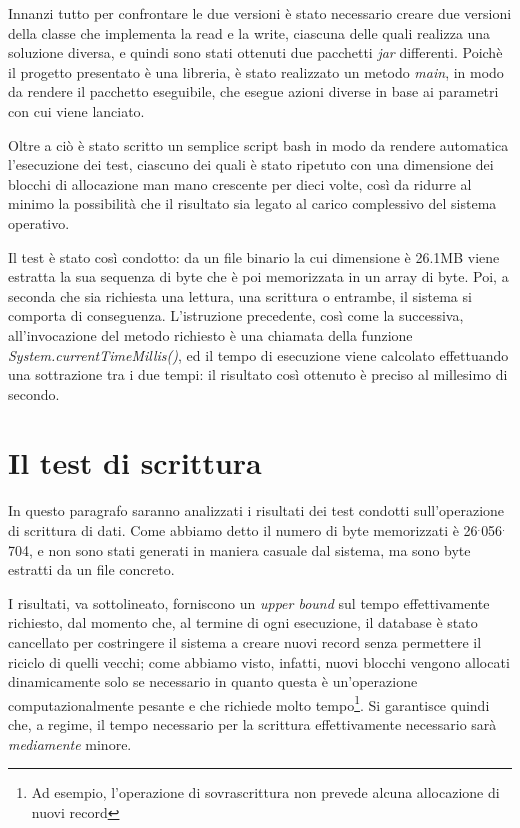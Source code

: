 Innanzi tutto per confrontare le due versioni è stato necessario creare due versioni della classe che implementa la read e la write, ciascuna delle quali realizza una soluzione diversa, e quindi sono stati ottenuti due pacchetti \emph{jar} differenti. Poichè il progetto presentato è una libreria, è stato realizzato un metodo \emph{main}, in modo da rendere il pacchetto eseguibile, che esegue azioni diverse in base ai parametri con cui viene lanciato.

Oltre a ciò è stato scritto un semplice script bash in modo da rendere automatica l'esecuzione dei test, ciascuno dei quali è stato ripetuto con una dimensione dei blocchi di allocazione man mano crescente per dieci volte, così da ridurre al minimo la possibilità che il risultato sia legato al carico complessivo del sistema operativo.

Il test è stato così condotto: da un file binario la cui dimensione è 26.1MB viene estratta la sua sequenza di byte che è poi memorizzata in un array di byte. Poi, a seconda che sia richiesta una lettura, una scrittura o entrambe, il sistema si comporta di conseguenza. L'istruzione precedente, così come la successiva, all'invocazione del metodo richiesto è una chiamata della funzione \emph{System.currentTimeMillis()}, ed il tempo di esecuzione viene calcolato effettuando una sottrazione tra i due tempi: il risultato così ottenuto è preciso al millesimo di secondo.

\section{Il test di scrittura}
In questo paragrafo saranno analizzati i risultati dei test condotti sull'operazione di scrittura di dati. Come abbiamo detto il numero di byte memorizzati è 26$^{.}$056$^{.}$704, e non sono stati generati in maniera casuale dal sistema, ma sono byte estratti da un file concreto.

I risultati, va sottolineato, forniscono un \emph{upper bound} sul tempo effettivamente richiesto, dal momento che, al termine di ogni esecuzione, il database è stato cancellato per costringere il sistema a creare nuovi record senza permettere il riciclo di quelli vecchi; come abbiamo visto, infatti, nuovi blocchi vengono allocati dinamicamente solo se necessario in quanto questa è un'operazione computazionalmente pesante e che richiede molto tempo\footnote{Ad esempio, l'operazione di sovrascrittura non prevede alcuna allocazione di nuovi record}. Si garantisce quindi che, a regime, il tempo necessario per la scrittura effettivamente necessario sarà \emph{mediamente} minore.

